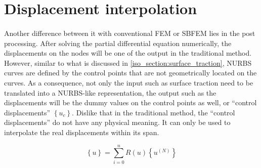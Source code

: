 \section{Displacement interpolation}
\label{iso_section:interpolation}
\paragraph{}
Another difference between it with conventional FEM or SBFEM lies in the post processing.
After solving the partial differential equation numerically, the displacements on the nodes will be one of the output in
    the traditional method.
However, similar to what is discussed in \ref{iso_section:surface_traction}, NURBS curves are defined by the control points
    that are not geometrically located on the curves.
As a consequence, not only the input such as surface traction need to be translated into a NURBS-like representation, the
    output such as the displacements will be the dummy values on the control points as well, or ``control displacements''
    $\left\{ u_c \right\}$.
Dislike that in the traditional method, the ``control displacements'' do not have any physical meaning. It can only be used
    to interpolate the real displacements within its span.

\begin{equation}
    \left\{ u \right\}=
    \sum_{i=0}^n
    R(u) \left\{u^{(N)}\right\}
\label{iso_eq:displacement_interpolation}
\end{equation}
\pagebreak